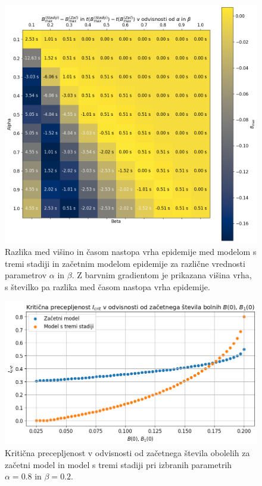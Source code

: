 \documentclass[slovene,11pt,a4paper]{article}
\begin{document}
\newpage

\begin{figure}[h!]
\centering
\includegraphics[width=13.5cm]{primerjava1.png}
\caption{Razlika med višino in časom nastopa vrha epidemije med modelom s tremi stadiji in začetnim modelom epidemije za različne vrednosti parametrov $\alpha$ in $\beta$. Z barvnim gradientom je prikazana višina vrha, s številko pa razlika med časom nastopa vrha epidemije.}
\end{figure}

\begin{figure}[h!]
\centering
\includegraphics[width=13.5cm]{primerjava2.png}
\caption{Kritična precepljenost v odvisnosti od začetnega števila obolelih za začetni model in model s tremi stadiji pri izbranih parametrih $\alpha = 0.8$ in $\beta = 0.2$.}
\end{figure}
\end{document}
